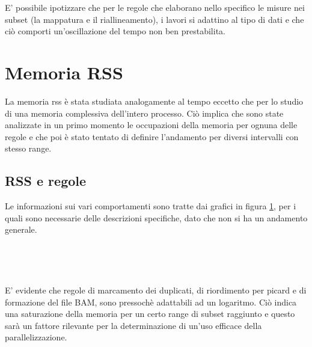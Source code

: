 E' possibile ipotizzare che per le regole che elaborano nello specifico le misure nei subset (la mappatura e il riallineamento), i lavori si adattino al tipo di dati e che ciò comporti un'oscillazione del tempo non ben prestabilita.

\section{Memoria RSS}
La memoria rss è stata studiata analogamente al tempo eccetto che per lo studio di una memoria complessiva dell'intero processo. 
Ciò implica che sono state analizzate in un primo momento le occupazioni della memoria per ognuna delle regole e che poi è stato tentato di definire l'andamento per diversi intervalli con stesso range. 

\subsection{RSS e regole}
Le informazioni sui vari comportamenti sono tratte dai grafici in figura \ref{fig:RSSr}, per i quali sono necessarie delle descrizioni specifiche, dato che non si ha un andamento generale. 
\begin{figure}[H]
\centering
{} \quad
{} \\
\end{figure}
\begin{figure}[H]
\ContinuedFloat
\centering
{} \quad
{} \\
\end{figure}
\begin{figure}[H]
\ContinuedFloat
\centering
{} 
\caption{}
\label{fig:RSSr}
\end{figure}

E' evidente che regole di marcamento dei duplicati, di riordimento per picard e di formazione del file BAM, sono pressochè adattabili ad un logaritmo. 
Ciò indica una saturazione della memoria per un certo range di subset raggiunto e questo sarà un fattore rilevante per la determinazione di un'uso efficace della parallelizzazione.


